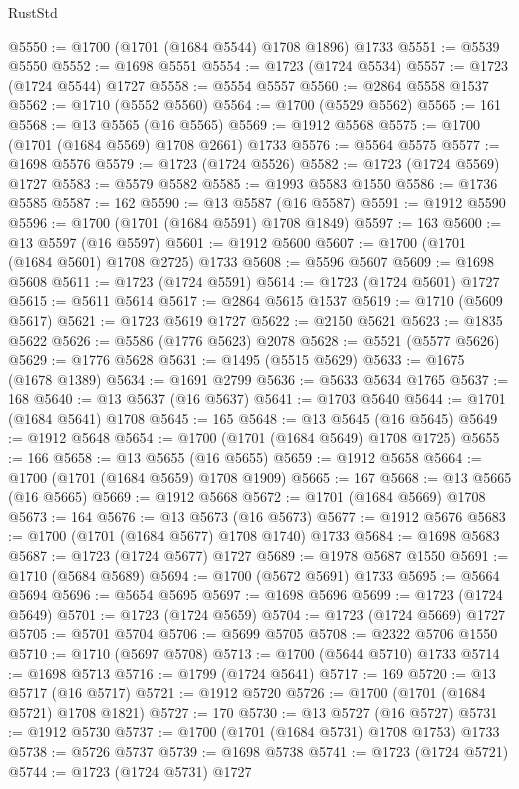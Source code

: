 \begin{lexlean}{RustStd}
\begin{coremodule}
@5550 := @1700 (@1701 (@1684 @5544) @1708 @1896) @1733
@5551 := @5539 @5550
@5552 := @1698 @5551
@5554 := @1723 (@1724 @5534)
@5557 := @1723 (@1724 @5544) @1727
@5558 := @5554 @5557
@5560 := @2864 @5558 @1537
@5562 := @1710 (@5552 @5560)
@5564 := @1700 (@5529 @5562)
@5565 := 161
@5568 := @13 @5565 (@16 @5565)
@5569 := @1912 @5568
@5575 := @1700 (@1701 (@1684 @5569) @1708 @2661) @1733
@5576 := @5564 @5575
@5577 := @1698 @5576
@5579 := @1723 (@1724 @5526)
@5582 := @1723 (@1724 @5569) @1727
@5583 := @5579 @5582
@5585 := @1993 @5583 @1550
@5586 := @1736 @5585
@5587 := 162
@5590 := @13 @5587 (@16 @5587)
@5591 := @1912 @5590
@5596 := @1700 (@1701 (@1684 @5591) @1708 @1849)
@5597 := 163
@5600 := @13 @5597 (@16 @5597)
@5601 := @1912 @5600
@5607 := @1700 (@1701 (@1684 @5601) @1708 @2725) @1733
@5608 := @5596 @5607
@5609 := @1698 @5608
@5611 := @1723 (@1724 @5591)
@5614 := @1723 (@1724 @5601) @1727
@5615 := @5611 @5614
@5617 := @2864 @5615 @1537
@5619 := @1710 (@5609 @5617)
@5621 := @1723 @5619 @1727
@5622 := @2150 @5621
@5623 := @1835 @5622
@5626 := @5586 (@1776 @5623) @2078
@5628 := @5521 (@5577 @5626)
@5629 := @1776 @5628
@5631 := @1495 (@5515 @5629)
@5633 := @1675 (@1678 @1389)
@5634 := @1691 @2799
@5636 := @5633 @5634 @1765
@5637 := 168
@5640 := @13 @5637 (@16 @5637)
@5641 := @1703 @5640
@5644 := @1701 (@1684 @5641) @1708
@5645 := 165
@5648 := @13 @5645 (@16 @5645)
@5649 := @1912 @5648
@5654 := @1700 (@1701 (@1684 @5649) @1708 @1725)
@5655 := 166
@5658 := @13 @5655 (@16 @5655)
@5659 := @1912 @5658
@5664 := @1700 (@1701 (@1684 @5659) @1708 @1909)
@5665 := 167
@5668 := @13 @5665 (@16 @5665)
@5669 := @1912 @5668
@5672 := @1701 (@1684 @5669) @1708
@5673 := 164
@5676 := @13 @5673 (@16 @5673)
@5677 := @1912 @5676
@5683 := @1700 (@1701 (@1684 @5677) @1708 @1740) @1733
@5684 := @1698 @5683
@5687 := @1723 (@1724 @5677) @1727
@5689 := @1978 @5687 @1550
@5691 := @1710 (@5684 @5689)
@5694 := @1700 (@5672 @5691) @1733
@5695 := @5664 @5694
@5696 := @5654 @5695
@5697 := @1698 @5696
@5699 := @1723 (@1724 @5649)
@5701 := @1723 (@1724 @5659)
@5704 := @1723 (@1724 @5669) @1727
@5705 := @5701 @5704
@5706 := @5699 @5705
@5708 := @2322 @5706 @1550
@5710 := @1710 (@5697 @5708)
@5713 := @1700 (@5644 @5710) @1733
@5714 := @1698 @5713
@5716 := @1799 (@1724 @5641)
@5717 := 169
@5720 := @13 @5717 (@16 @5717)
@5721 := @1912 @5720
@5726 := @1700 (@1701 (@1684 @5721) @1708 @1821)
@5727 := 170
@5730 := @13 @5727 (@16 @5727)
@5731 := @1912 @5730
@5737 := @1700 (@1701 (@1684 @5731) @1708 @1753) @1733
@5738 := @5726 @5737
@5739 := @1698 @5738
@5741 := @1723 (@1724 @5721)
@5744 := @1723 (@1724 @5731) @1727

\end{coremodule}
\end{lexlean}
